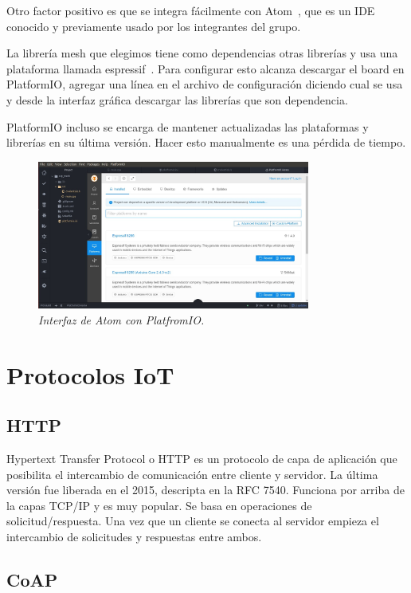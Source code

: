 Otro factor positivo es que se integra fácilmente con Atom~\cite{Atom}, que es un IDE conocido y previamente usado por los integrantes del grupo.

La librería mesh que elegimos tiene como dependencias otras librerías y usa una plataforma llamada espressif~\cite{espressif-platformio}. Para configurar esto alcanza descargar el board en PlatformIO, agregar una línea en el archivo de configuración diciendo cual se usa y desde la interfaz gráfica descargar las librerías que son dependencia. 

PlatformIO incluso se encarga de mantener actualizadas las plataformas y librerías en su última versión. Hacer esto manualmente es una pérdida de tiempo.

\begin{figure}[h!]
  \centering
  \includegraphics[width=0.8\textwidth, keepaspectratio]{images/platformio}
  \caption{\textit{Interfaz de Atom con PlatfromIO.}}
  \label{fig:atom-plat}
\end{figure}

\section{Protocolos IoT}

\subsection{HTTP}

Hypertext Transfer Protocol o HTTP es un protocolo de capa de aplicación que posibilita el intercambio de comunicación entre cliente y servidor. La última versión fue liberada en el 2015,  descripta en la RFC 7540. Funciona por arriba de la capas TCP/IP y es muy popular. Se basa en operaciones de solicitud/respuesta. Una vez que un cliente se conecta al servidor empieza el intercambio de solicitudes y respuestas entre ambos.

\subsection{CoAP}

